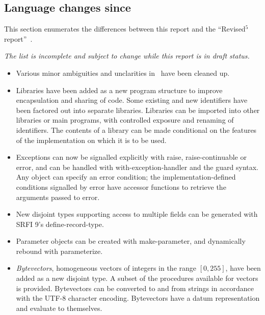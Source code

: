 

\subsection*{Language changes since \rfivers}
\label{differences}
This section enumerates the differences between this report and
the ``Revised$^5$ report''~\cite{R5RS}.

{\em The list is incomplete and subject to change while this report is in draft status.}


\begin{itemize}

\item Various minor ambiguities and unclarities in \rfivers\ have been cleaned up.

\item Libraries have been added as a new program structure to improve
encapsulation and sharing of code.  Some existing and new identifiers
have been factored out into separate libraries.
Libraries can be imported into other libraries or main programs, with
controlled exposure and renaming of identifiers.
The contents of a library can be made conditional on the features of
the implementation on which it is to be used.

\item Exceptions can now be signalled explicitly with {\cf raise},
{\cf raise-continuable} or {\cf error}, and can be handled with {\cf
with-exception-handler} and the {\cf guard} syntax.
Any object can specify an error condition; the implementation-defined
conditions signalled by {\cf error} have accessor functions to
retrieve the arguments passed to {\cf error}.

\item New disjoint types supporting access to multiple fields can be
generated with SRFI 9's {\cf define-record-type}.

\item Parameter objects can be created with {\cf make-parameter}, and
dynamically rebound with {\cf parameterize}.

\item {\em Bytevectors}, homogeneous vectors of integers in the range
$[0, 255]$, have been added as a new disjoint type.
A subset of the procedures available for vectors is provided.  Bytevectors
can be converted to and from strings in accordance with the UTF-8 character encoding.
Bytevectors have a datum representation and evaluate to themselves.


\end{itemize}
